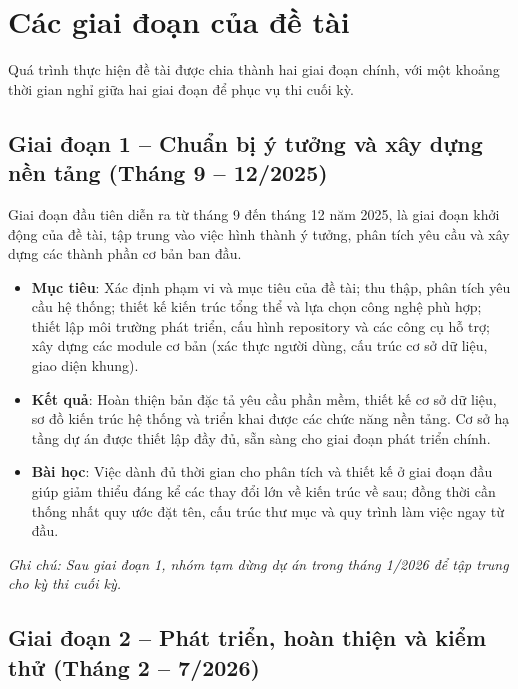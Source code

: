 \section{Các giai đoạn của đề tài}

Quá trình thực hiện đề tài được chia thành hai giai đoạn chính, với một khoảng thời gian nghỉ giữa hai giai đoạn để phục vụ thi cuối kỳ.
 
\subsection{Giai đoạn 1 -- Chuẩn bị ý tưởng và xây dựng nền tảng (Tháng 9 -- 12/2025)}
 
Giai đoạn đầu tiên diễn ra từ tháng 9 đến tháng 12 năm 2025, là giai đoạn khởi động của đề tài, tập trung vào việc hình thành ý tưởng, phân tích yêu cầu và xây dựng các thành phần cơ bản ban đầu.

\begin{itemize}
    \item \textbf{Mục tiêu}: Xác định phạm vi và mục tiêu của đề tài; thu thập, phân tích yêu cầu hệ thống; thiết kế kiến trúc tổng thể và lựa chọn công nghệ phù hợp; thiết lập môi trường phát triển, cấu hình repository và các công cụ hỗ trợ; xây dựng các module cơ bản (xác thực người dùng, cấu trúc cơ sở dữ liệu, giao diện khung).
    \item \textbf{Kết quả}: Hoàn thiện bản đặc tả yêu cầu phần mềm, thiết kế cơ sở dữ liệu, sơ đồ kiến trúc hệ thống và triển khai được các chức năng nền tảng. Cơ sở hạ tầng dự án được thiết lập đầy đủ, sẵn sàng cho giai đoạn phát triển chính.
    \item \textbf{Bài học}: Việc dành đủ thời gian cho phân tích và thiết kế ở giai đoạn đầu giúp giảm thiểu đáng kể các thay đổi lớn về kiến trúc về sau; đồng thời cần thống nhất quy ước đặt tên, cấu trúc thư mục và quy trình làm việc ngay từ đầu.
\end{itemize}

\medskip
\noindent\textit{Ghi chú: Sau giai đoạn 1, nhóm tạm dừng dự án trong tháng 1/2026 để tập trung cho kỳ thi cuối kỳ.}
 
\subsection{Giai đoạn 2 -- Phát triển, hoàn thiện và kiểm thử (Tháng 2 -- 7/2026)}
 
